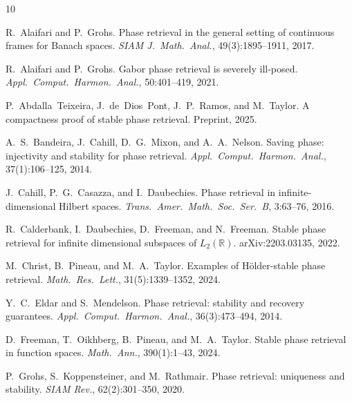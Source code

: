 \documentclass[11pt]{amsart}
\theoremstyle{definition}
\theoremstyle{remark}
\begin{document}
\begin{thebibliography}{10}

R.~Alaifari and P.~Grohs.
\newblock Phase retrieval in the general setting of continuous frames for
  {B}anach spaces.
\newblock \emph{SIAM J.\ Math.\ Anal.}, 49(3):1895--1911, 2017.

R.~Alaifari and P.~Grohs.
\newblock Gabor phase retrieval is severely ill-posed.
\newblock \emph{Appl.\ Comput.\ Harmon.\ Anal.}, 50:401--419, 2021.

P.~Abdalla~Teixeira, J.~de~Dios~Pont, J.~P.~Ramos, and M.~Taylor.
\newblock A compactness proof of stable phase retrieval.
\newblock Preprint, 2025.

A.~S.~Bandeira, J.~Cahill, D.~G.~Mixon, and A.~A.~Nelson.
\newblock Saving phase: injectivity and stability for phase retrieval.
\newblock \emph{Appl.\ Comput.\ Harmon.\ Anal.}, 37(1):106--125, 2014.

J.~Cahill, P.~G.~Casazza, and I.~Daubechies.
\newblock Phase retrieval in infinite-dimensional {H}ilbert spaces.
\newblock \emph{Trans.\ Amer.\ Math.\ Soc.\ Ser.~B}, 3:63--76, 2016.

R.~Calderbank, I.~Daubechies, D.~Freeman, and N.~Freeman.
\newblock Stable phase retrieval for infinite dimensional subspaces of
  $L_2(\mathbb{R})$.
\newblock arXiv:2203.03135, 2022.

M.~Christ, B.~Pineau, and M.~A.~Taylor.
\newblock Examples of {H}\"older-stable phase retrieval.
\newblock \emph{Math.\ Res.\ Lett.}, 31(5):1339--1352, 2024.

Y.~C.~Eldar and S.~Mendelson.
\newblock Phase retrieval: stability and recovery guarantees.
\newblock \emph{Appl.\ Comput.\ Harmon.\ Anal.}, 36(3):473--494, 2014.

D.~Freeman, T.~Oikhberg, B.~Pineau, and M.~A.~Taylor.
\newblock Stable phase retrieval in function spaces.
\newblock \emph{Math.\ Ann.}, 390(1):1--43, 2024.

P.~Grohs, S.~Koppensteiner, and M.~Rathmair.
\newblock Phase retrieval: uniqueness and stability.
\newblock \emph{SIAM Rev.}, 62(2):301--350, 2020.

\end{thebibliography}
\end{document}
